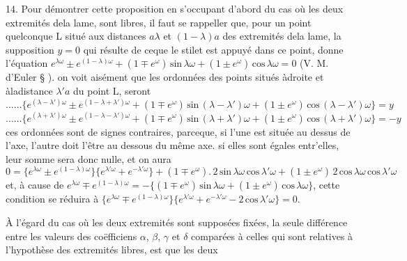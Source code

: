 \documentclass[11pt,a4paper]{article}
\begin{document}
14. Pour démontrer cette proposition en s'occupant d'abord du cas où les deux
extremités dela lame,  sont libres, il faut se rappeller que,
pour un point quelconque L situé aux distances $a\lambda$ et $(1-\lambda)a$ des extremités dela lame,
la supposition $y = 0$ qui résulte de ceque le stilet est appuyé dans ce point,
donne l'équation $e^{\lambda\omega} \pm e^{(1-\lambda)\omega} + (1 \mp e^{\omega})\,\text{sin}\,\lambda\omega + (1 \pm e^{\omega})\,\text{cos}\,\lambda\omega = 0$ (V. M. d'Euler § ).
on voit aisément que les ordonnées des points situés àdroite et àladistance $\lambda' a$ du
point L, seront
\[ \ldots\ldots\{e^{(\lambda-\lambda')\omega} \pm e^{(1-\lambda+\lambda')\omega} + (1 \mp e^{\omega})\,\text{sin}\,(\lambda-\lambda')\omega + (1 \pm e^{\omega})\,\text{cos}\,(\lambda-\lambda')\omega\} = y \]
\[ \ldots\ldots\{e^{(\lambda+\lambda')\omega} \pm e^{(1-\lambda-\lambda')\omega} + (1 \mp e^{\omega})\,\text{sin}\,(\lambda+\lambda')\omega + (1 \pm e^{\omega})\,\text{cos}\,(\lambda+\lambda')\omega\} = -y \]
ces ordonnées sont de signes contraires, parceque, si l'une est située au dessus
de l'axe, l'autre doit l'être au dessous du même axe. si elles sont égales entr'elles,
leur somme sera donc nulle, et on aura
\[ 0 = \{e^{\lambda\omega} \pm e^{(1-\lambda)\omega}\}\{e^{\lambda'\omega} + e^{-\lambda'\omega}\} + (1 \mp e^{\omega}).\,2\,\text{sin}\,\lambda\omega\,\text{cos}\,\lambda'\omega + (1 \pm e^{\omega})\,2\,\text{cos}\,\lambda\omega\,\text{cos}\,\lambda'\omega \]
et, à cause de $e^{\lambda\omega} \mp e^{(1-\lambda)\omega} = -\{(1 \mp e^{\omega})\,\text{sin}\,\lambda\omega + (1 \pm e^{\omega})\,\text{cos}\,\lambda\omega\}$,
cette condition se réduira à $\{e^{\lambda\omega} \mp e^{(1-\lambda)\omega}\}\{e^{\lambda'\omega} + e^{-\lambda'\omega} - 2\,\text{cos}\,\lambda'\omega\} = 0$.

À l'égard du cas où les deux extremités sont supposées fixées, la seule
différence entre les valeurs des coëfficiens $\alpha$, $\beta$, $\gamma$ et $\delta$ comparées à celles
qui sont relatives à l'hypothèse des extremités libres, est que les deux
\end{document}

